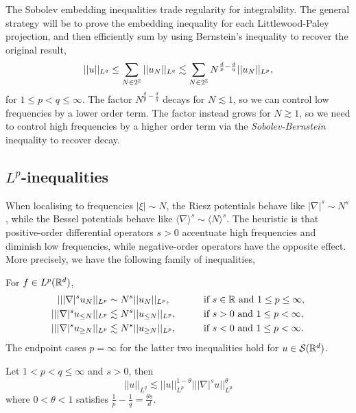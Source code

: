 The Sobolev embedding inequalities trade regularity for integrability. The general strategy will be to prove the embedding inequality for each Littlewood-Paley projection, and then efficiently sum by using Bernstein's inequality to recover the original result,
	\begin{align*}
		||u||_{L^q}
			\leq \sum_{N \in 2^\mathbb Z} ||u_N||_{L^q} \lesssim \sum_{N \in 2^\mathbb Z} N^{\frac{d}{p} - \frac{d}{q}} ||u_N||_{L^p},
	\end{align*}
for $1 \leq p < q \leq \infty$. The factor $N^{\frac{d}{p} - \frac{d}{q}}$ decays for $N \lesssim 1$, so we can control low frequencies by a lower order term. The factor instead grows for $N \gtrsim 1$, so we need to control high frequencies by a higher order term via the \textit{Sobolev-Bernstein} inequality to recover decay. 

\subsection{$L^p$-inequalities}

When localising to frequencies $|\xi| \sim N$, the Riesz potentials behave like $|\nabla|^s \sim N^s$, while the Bessel potentials behave like $\langle \nabla \rangle^s \sim \langle N \rangle^s$. The heuristic is that positive-order differential operators $s > 0$ accentuate high frequencies and diminish low frequencies, while negative-order operators have the opposite effect. More precisely, we have the following family of inequalities, 


\begin{lemma} For $f \in L^p (\mathbb R^d)$, 
				\begin{alignat*}{2}
					|| |\nabla|^s u_N||_{L^p} 
						&\sim N^s ||u_N||_{L^p}, &&\qquad \text{if }s \in \mathbb R \text{ and } 1 \leq p \leq \infty, \\
					|| |\nabla|^s u_{\leq N}||_{L^p} 
						&\lesssim N^s ||u_{\leq N}||_{L^p}, &&\qquad\text{if }s > 0 \text{ and } 1 \leq p < \infty, \\
					|| |\nabla|^s u_{\geq N}||_{L^p} 
						&\lesssim N^s ||u_{\geq N}||_{L^p}, &&\qquad\text{if }s < 0 \text{ and } 1 \leq p < \infty.
				\end{alignat*}			
		The endpoint cases $p = \infty$ for the latter two inequalities hold for $u \in \mathcal S (\mathbb R^d)$. 
\end{lemma}



\begin{theorem}
	Let $1 < p < q \leq \infty$ and $s > 0$, then 
		\[ ||u||_{L^q} \lesssim ||u||_{L^p}^{1 - \theta} || |\nabla|^s u ||_{L^p}^\theta \]
	where $0 < \theta < 1$ satisfies $\tfrac1p - \tfrac1q = \tfrac{\theta s}{d}$. 	
\end{theorem}


